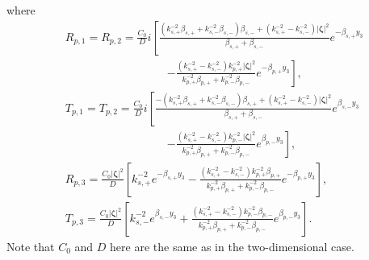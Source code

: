 \documentclass[final,reqno]{siamltex}
\begin{document}
where 
\begin{align*}
  &R_{p,1}=R_{p,2}=\frac{C_0}{D}i\left[\frac{(k_{s,+}^{-2}\beta_{s,+}+k_{s,-}^{-2}\beta_{s,-})\beta_{s,-}+(k_{s,+}^{-2}-k_{s,-}^{-2})|\boldsymbol{\zeta}|^2}{\beta_{s,+}+\beta_{s,-}}e^{-\beta_{s,+}y_3}\right. \\
  &\qquad\qquad\qquad\qquad\quad\left.-\frac{(k_{s,+}^{-2}-k_{s,-}^{-2})k_{p,+}^{-2}|\boldsymbol{\zeta}|^2}{k_{p,+}^{-2}\beta_{p,+}+k_{p,-}^{-2}\beta_{p,-}}e^{-\beta_{p,+}y_3}\right], \\
  &T_{p,1}=T_{p,2}=\frac{C_0}{D}i\left[\frac{-(k_{s,+}^{-2}\beta_{s,+}+k_{s,-}^{-2}\beta_{s,-})\beta_{s,+}+(k_{s,+}^{-2}-k_{s,-}^{-2})|\boldsymbol{\zeta}|^2}{\beta_{s,+}+\beta_{s,-}}e^{\beta_{s,-}y_3}\right. \\
  &\qquad\qquad\qquad\qquad\quad\left.-\frac{(k_{s,+}^{-2}-k_{s,-}^{-2})k_{p,-}^{-2}|\boldsymbol{\zeta}|^2}{k_{p,+}^{-2}\beta_{p,+}+k_{p,-}^{-2}\beta_{p,-}}e^{\beta_{p,-}y_3}\right], \\
  &R_{p,3}=\frac{C_0|\boldsymbol{\zeta}|^2}{D}\left[k_{s,+}^{-2}e^{-\beta_{s,+}y_3}-\frac{(k_{s,+}^{-2}-k_{s,-}^{-2})k_{p,+}^{-2}\beta_{p,+}}{k_{p,+}^{-2}\beta_{p,+}+k_{p,-}^{-2}\beta_{p,-}}e^{-\beta_{p,+}y_3}\right], \\
  &T_{p,3}=\frac{C_0|\boldsymbol{\zeta}|^2}{D}\left[k_{s,-}^{-2}e^{\beta_{s,-}y_3}+\frac{(k_{s,+}^{-2}-k_{s,-}^{-2})k_{p,-}^{-2}\beta_{p,-}}{k_{p,+}^{-2}\beta_{p,+}+k_{p,-}^{-2}\beta_{p,-}}e^{\beta_{p,-}y_3}\right]. 
\end{align*}
Note that $C_0$ and $D$ here are the same as in the two-dimensional case. 
\end{document}

